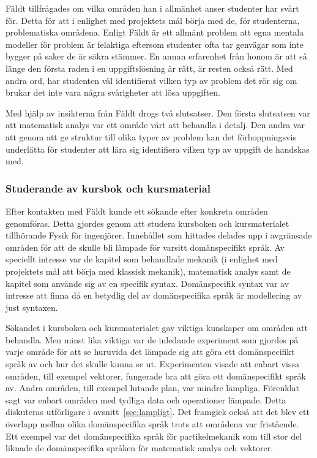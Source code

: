 Fäldt tillfrågades om vilka områden han i allmänhet anser studenter har
svårt för. Detta för att i enlighet med projektets mål börja med de, för
studenterna, problematiska områdena. Enligt Fäldt är ett allmänt problem att
egna mentala modeller för problem är felaktiga eftersom studenter ofta tar
genvägar som inte bygger på saker de är säkra stämmer. En annan erfarenhet
från honom är att så länge den första raden i en uppgiftslösning är rätt, är
resten också rätt. Med andra ord, har studenten väl identifierat vilken typ av
problem det rör sig om brukar det inte vara några svårigheter att lösa
uppgiften.

Med hjälp av insikterna från Fäldt drogs två slutsatser. Den första slutsatsen
var att matematisk analys var ett område värt att behandla i detalj. Den andra var att genom att ge struktur till olika typer av problem kan det
förhoppningsvis underlätta för studenter att lära sig identifiera vilken
typ av uppgift de handskas med.

\subsubsection*{Studerande av kursbok och kursmaterial}

Efter kontakten med Fäldt kunde ett sökande efter konkreta områden genomföras.
Detta gjordes genom att studera kursboken och kursmaterialet tillhörande Fysik
för ingenjörer. Innehållet som hittades delades upp i avgränsade områden för att
de skulle bli lämpade för varsitt domänspecifikt språk. Av speciellt intresse
var de kapitel som behandlade mekanik (i enlighet med projektets mål att börja
med klassisk mekanik), matematisk analys samt de kapitel som använde sig av en
specifik syntax. Domänspecifik syntax var av intresse att finna
då en betydlig del av domänspecifika språk är modellering av just syntaxen.

Sökandet i kursboken och kursmaterialet gav viktiga kunskaper om områden att
behandla. Men minst lika viktiga var de inledande experiment som gjordes på
varje område för att se huruvida det lämpade sig att göra ett domänspecifikt
språk av och hur det skulle kunna se ut. Experimenten visade att enbart vissa
områden, till exempel vektorer, fungerade bra att göra ett domänspecifikt språk
av. Andra områden, till exempel lutande plan, var mindre lämpliga. Förenklat
sagt var enbart områden med tydliga data och operationer lämpade. Detta
diskuteras utförligare i avsnitt~\ref{sec:lampligt}. Det framgick också att det
blev ett överlapp mellan olika domänspecifika språk trots att områdena var fristående.
Ett exempel var det domänspecifika språk för partikelmekanik som till stor del
liknade de domänspecifika språken för matematisk analys och vektorer.

